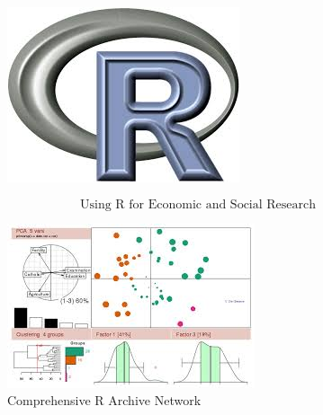 \documentclass{beamer}
\begin{document}
\begin{frame}
	\begin{figure}
		\centering
		\includegraphics[width=0.7\linewidth]{Rlogo}
	\end{figure}
	\LARGE
	\[ \mbox{Using R for Economic and Social Research} \]	
	
	
	
\end{frame}



	\begin{frame}[fragile]
		
		
		\begin{figure}
			\centering
			\includegraphics[width=0.97\linewidth]{CRAN}
			\caption{Comprehensive R Archive Network}
			
		\end{figure}
		
		
	\end{frame}
	
\end{document}
